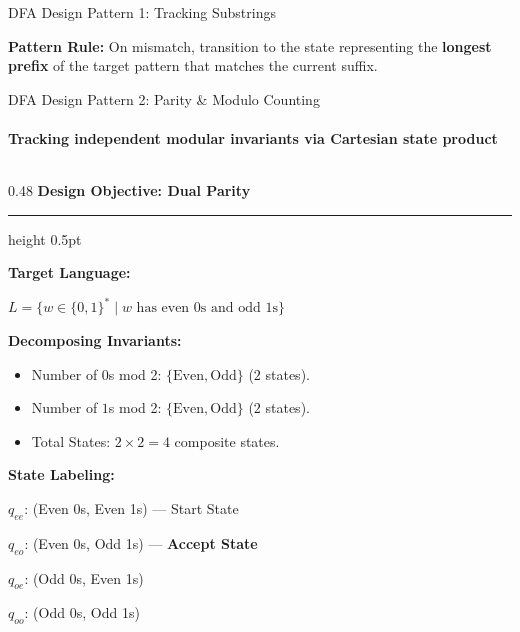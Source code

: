 \documentclass[aspectratio=169, 10pt]{beamer}
\newcommand{\colheader}[1]{%
  {\noindent\footnotesize\bfseries\color{gimpanavy}#1}%
  \vspace{0.02cm}%
  {\color{gimpanavy!30}\hrule height 0.5pt}%
  \vspace{0.05cm}%
}
\newcommand{\cardtitle}[1]{{\noindent\footnotesize\bfseries\color{gimpanavy}#1}\par\vspace{0.03cm}}
\newcommand{\greentitle}[1]{{\noindent\footnotesize\bfseries\color{accentGreen}#1}\par\vspace{0.03cm}}
\begin{document}
\begin{frame}{DFA Design Pattern 1: Tracking Substrings}
  \vspace{0.08cm}
  \begin{tcolorbox}[spotlightcard]
    {\scriptsize\textbf{Pattern Rule:} On mismatch, transition to the state representing the \textbf{longest prefix} of the target pattern that matches the current suffix.}
  \end{tcolorbox}
\end{frame}

\begin{frame}{DFA Design Pattern 2: Parity \& Modulo Counting}
  \framesubtitle{Tracking independent modular invariants via Cartesian state product}
  
  \begin{columns}[T]
    \begin{column}{0.48\textwidth}
      \colheader{Design Objective: Dual Parity}
      \begin{tcolorbox}[conceptcard]
        \cardtitle{Target Language:}
        {\scriptsize
        $L = \{w \in \{0, 1\}^* \mid w \text{ has even 0s and odd 1s}\}$
        \vspace{0.04cm}
        
        \textbf{Decomposing Invariants:}
        \begin{itemize}\setlength{\itemsep}{2pt}\scriptsize
          \item Number of $0$s mod 2: $\{\text{Even}, \text{Odd}\}$ ($2$ states).
          \item Number of $1$s mod 2: $\{\text{Even}, \text{Odd}\}$ ($2$ states).
          \item Total States: $2 \times 2 = 4$ composite states.
        \end{itemize}
        }
      \end{tcolorbox}
      \begin{tcolorbox}[examplecard]
        \greentitle{State Labeling:}
        {\scriptsize
        $q_{ee}$: (Even 0s, Even 1s) --- Start State\par
        $q_{eo}$: (Even 0s, Odd 1s) --- \textbf{Accept State}\par
        $q_{oe}$: (Odd 0s, Even 1s)\par
        $q_{oo}$: (Odd 0s, Odd 1s)
        }
      \end{tcolorbox}
    \end{column}
    

\end{columns}
\end{frame}
\end{document}
